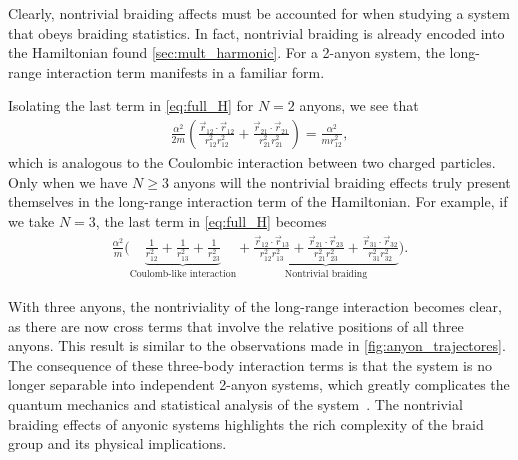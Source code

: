 Clearly, nontrivial braiding affects must be accounted for when studying a system that obeys braiding statistics. In fact, nontrivial braiding is already encoded into the Hamiltonian found \cref{sec:mult_harmonic}. For a 2-anyon system, the long-range interaction term manifests in a familiar form. 

Isolating the last term in \cref{eq:full_H} for $N=2$ anyons, we see that
\begin{align*}
    \frac{\alpha^2}{2m}\left( \frac{\vec{r}_{12}\cdot\vec{r}_{12}}{r_{12}^2r_{12}^2} + \frac{\vec{r}_{21}\cdot\vec{r}_{21}}{r_{21}^2r_{21}^2} \right)  = \frac{\alpha^2}{mr_{12}^2},
\end{align*}
which is analogous to the Coulombic interaction between two charged particles.
Only when we have $N\geq 3$ anyons will the nontrivial braiding effects truly present themselves in the long-range interaction term of the Hamiltonian. For example, if we take $N=3$, the last term in \cref{eq:full_H} becomes
\begin{align*}
    \frac{\alpha^2}{m}\biggl( \underbrace{\frac{1}{r_{12}^2} + \frac{1}{r_{13}^2} + \frac{1}{r_{23}^2}}_{\textrm{Coulomb-like interaction}} + \underbrace{\frac{\vec{r}_{12}\cdot\vec{r}_{13}}{r_{12}^2r_{13}^2} + \frac{\vec{r}_{21}\cdot\vec{r}_{23}}{r_{21}^2r_{23}^2} + \frac{\vec{r}_{31}\cdot\vec{r}_{32}}{r_{31}^2r_{32}^2}}_\textrm{Nontrivial braiding} \biggr).
\end{align*}

With three anyons, the nontriviality of the long-range interaction becomes clear, as there are now cross terms that involve the relative positions of all three anyons. This result is similar to the observations made in \cref{fig:anyon_trajectores}. The consequence of these three-body interaction terms is that the system is no longer separable into independent 2-anyon systems, which greatly complicates the quantum mechanics and statistical analysis of the system~\cite{Khare2005}. The nontrivial braiding effects of anyonic systems highlights the rich complexity of the braid group and its physical implications.
